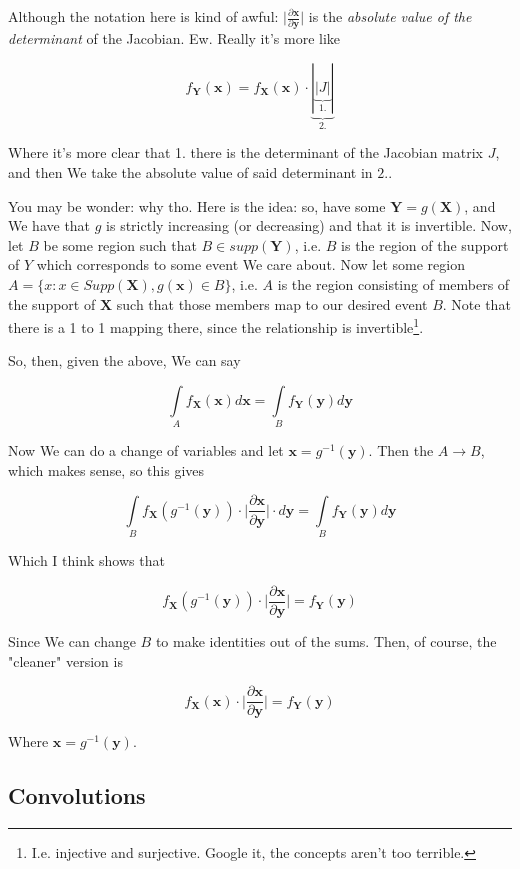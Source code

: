 \documentclass{article}
\begin{document}
		Although the notation here is kind of awful: $\big|\frac{\partial\bm{x}}{\partial\bm{y}} \big|$ is the \textit{absolute value of the determinant} of the Jacobian. Ew. Really it's more like 
		
		\[ f_{\bm{Y}}(\bm{x}) = f_{\bm{X}}(\bm{x})\cdot \underbrace{|\underbrace{|J|}_{1.}|}_{2.} \]
		
		Where it's more clear that 1. there is the determinant of the Jacobian matrix $J$, and then We take the absolute value of said determinant in $2.$.
		
		You may be wonder: why tho. Here is the idea: so, have some $\bm{Y} = g(\bm{X})$, and We have that $g$ is strictly increasing (or decreasing) and that it is invertible. Now, let $B$ be some region such that $B\in supp(\bm{Y})$, i.e. $B$ is the region of the support of $Y$ which corresponds to some event We care about. Now let some region $A = \{x:x\in Supp(\bm{X}), g(\bm{x})\in B \}$, i.e. $A$ is the region consisting of members of the support of $\bm{X}$ such that those members map to our desired event $B$. Note that there is a 1 to 1 mapping there, since the relationship is invertible\footnote{I.e. injective and surjective. Google it, the concepts aren't too terrible.}.
		
		So, then, given the above, We can say
		
		\[ \int\limits_A f_{\bm{X}}(\bm{x}) d\bm{x} = \int\limits_B f_{\bm{Y}}(\bm{y})d\bm{y}  \]
			
		Now We can do a change of variables and let $\bm{x} = g^{-1}(\bm{y})$. Then the $A\to B$, which makes sense, so this gives
		
		\[ \int\limits_B f_{\bm{X}}(g^{-1}(\bm{y}))\cdot \big|\frac{\partial\bm{x}}{\partial\bm{y}} \big|\cdot d\bm{y} = \int\limits_B f_{\bm{Y}}(\bm{y})d\bm{y}  \]
			
		Which I think shows that
		
		\[ f_{\bm{X}}(g^{-1}(\bm{y}))\cdot \bigg|\frac{\partial\bm{x}}{\partial\bm{y}}\bigg| =  f_{\bm{Y}}(\bm{y}) \]
			
		Since We can change $B$ to make identities out of the sums. Then, of course, the "cleaner" version is
		
		\[ f_{\bm{X}}(\bm{x})\cdot \bigg|\frac{\partial\bm{x}}{\partial\bm{y}} \bigg| =  f_{\bm{Y}}(\bm{y})  \]
			
		Where $\bm{x} = g^{-1}(\bm{y})$.
		
	\subsection{Convolutions}
	
\end{document}
